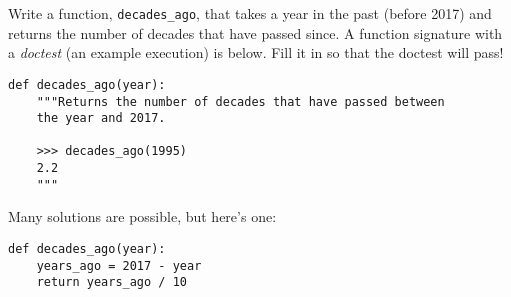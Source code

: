 \question Write a function, \texttt{decades\_ago}, that takes a year in the
past (before 2017) and returns the number of decades that have passed since. A
function signature with a \textit{doctest} (an example execution) is below.
Fill it in so that the doctest will pass!

\begin{lstlisting}
def decades_ago(year):
    """Returns the number of decades that have passed between
    the year and 2017.

    >>> decades_ago(1995)
    2.2
    """
\end{lstlisting}

\begin{solution}[1in]
Many solutions are possible, but here's one:
\vspace{0.2cm}
\begin{lstlisting}
def decades_ago(year):
    years_ago = 2017 - year
    return years_ago / 10
\end{lstlisting}
\end{solution}
